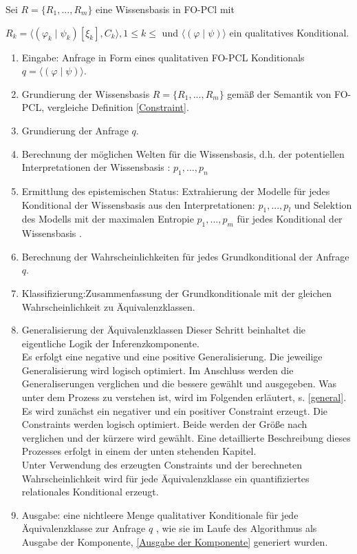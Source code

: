 \documentclass[draft]{scrreprt}
\begin{document}
\newpage

Sei $ R = \{R_1, ..., R_m\} $ eine Wissensbasis in FO-PCl mit

$ R_k =  \langle(\varphi_k \mid \psi_k)[\xi_k], C_k \rangle , 1 \leq k \leq  $ und $ \langle (\varphi \mid \psi) \rangle $ ein qualitatives Konditional.
\begin{enumerate}
	\item Eingabe: Anfrage in Form eines qualitativen FO-PCL Konditionals\\
	$ q = \langle (\varphi \mid \psi) \rangle $.
	\item Grundierung der Wissensbasis $ R = \{R_1, ..., R_m\} $ gemäß der Semantik von FO-PCL, vergleiche Definition \ref{Constraint}.
	\item Grundierung der Anfrage $ q $.
	\item Berechnung der möglichen Welten für die Wissensbasis, d.h. der potentiellen Interpretationen der Wissensbasis : $ p_1, ..., p_n $
	\item Ermittlung des epistemischen Status: Extrahierung der Modelle für jedes Konditional der Wissensbasis aus den Interpretationen: $ p_1, ..., p_l $ und Selektion des Modells mit der maximalen Entropie $p_1, ..., p_m$ für jedes Konditional der Wissensbasis .
	\item Berechnung der Wahrscheinlichkeiten für jedes Grundkonditional der Anfrage $ q $.
	\item Klassifizierung:Zusammenfassung der Grundkonditionale mit der gleichen Wahrscheinlichkeit zu Äquivalenzklassen. 

	\item Generalisierung der Äquivalenzklassen 
	Dieser Schritt beinhaltet die eigentliche Logik der Inferenzkomponente.\\
	Es erfolgt eine negative und eine positive Generalisierung. Die jeweilige Generalisierung wird logisch optimiert. Im Anschluss werden die Generaliserungen verglichen und die bessere gewählt und ausgegeben. Was unter dem Prozess zu verstehen ist, wird im Folgenden erläutert, s. \ref{general}. 
	Es wird zunächst ein negativer und ein positiver Constraint erzeugt. Die Constraints werden logisch optimiert. Beide werden der Größe nach verglichen und der kürzere wird gewählt. Eine detaillierte Beschreibung dieses Prozesses erfolgt in einem der unten stehenden Kapitel.\\
	Unter Verwendung des erzeugten Constraints und der berechneten Wahrscheinlichkeit wird für jede Äquivalenzklasse ein quantifiziertes relationales Konditional erzeugt.
	
	\item Ausgabe: eine nichtleere Menge qualitativer Konditionale für jede Äquivalenzklasse zur Anfrage $ q $ , wie sie im Laufe des Algorithmus als Ausgabe der Komponente, \ref{Ausgabe der Komponente} generiert wurden.
	
	
	
\end{enumerate}
\end{document}
